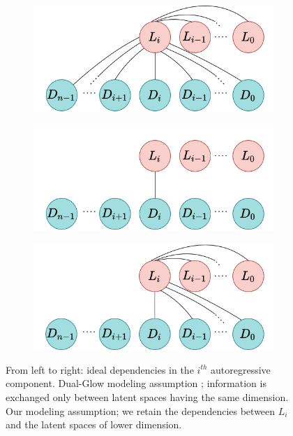 \begin{figure}[t]
\centering
   \begin{subfigure}{0.31\textwidth}
		\includegraphics[width=\textwidth]{Chapter1/figures/fulldependencies.png}
	\end{subfigure}%
	\quad
\begin{subfigure}{0.31\textwidth}
	\includegraphics[width=\textwidth]{Chapter1/figures/Dual-Glowdependencies.png} 
\end{subfigure}%
\quad 
\begin{subfigure}{0.31\textwidth}
	\includegraphics[width=\textwidth]{Chapter1/figures/oursdependencies.png}
	\end{subfigure}
\caption{From left to right: ideal dependencies in the $i^{th}$ autoregressive component. Dual-Glow modeling assumption \cite{Dual-Glow}; information is exchanged only between latent spaces having the same dimension. Our modeling assumption; we retain the dependencies between $L_i$ and the latent spaces of lower dimension.}	\label{ch1:fig:dependencies}
\end{figure}

